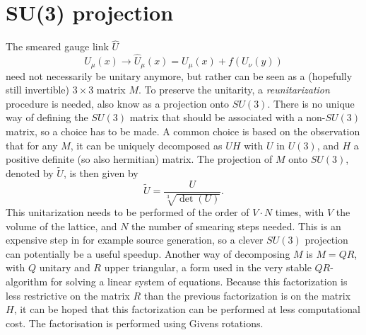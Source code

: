 \documentclass[a4paper,10pt]{article}
\begin{document}
\section{SU(3) projection}
The smeared gauge link $\hat{U}$
\begin{displaymath}
 U_{\mu}(x) \rightarrow\hat{U}_{\mu}(x)=U_{\mu}(x)+f(U_{\nu}(y))
\end{displaymath}
need not necessarily be unitary anymore, but rather can be seen as a (hopefully still invertible) $3\times 3$ matrix $M$. To preserve the unitarity, a \emph{reunitarization} procedure is needed, also know as a projection onto $SU(3)$. There is no unique way of defining the $SU(3)$ matrix that should be associated with a non-$SU(3)$ matrix, so a choice has to be made. A common choice is based on the observation that for any $M$, it can be uniquely decomposed as $UH$ with $U$ in $U(3)$, and $H$ a positive definite (so also hermitian) matrix. The projection of $M$ onto $SU(3)$, denoted by $\tilde{U}$, is then given by
\begin{displaymath}
 \tilde{U} = \frac{U}{\sqrt[3]{\det(U)}}.
\end{displaymath}
This unitarization needs to be performed of the order of $V\cdot N$ times, with $V$ the volume of the lattice, and $N$ the number of smearing steps needed. This is an expensive step in for example source generation, so a clever $SU(3)$ projection can potentially be a useful speedup.
Another way of decomposing $M$ is $M=QR$, with $Q$ unitary and $R$ upper triangular, a form used in the very stable $QR$-algorithm for solving a linear system of equations. Because this factorization is less restrictive on the matrix $R$ than the previous factorization is on the matrix $H$, it can be hoped that this factorization can be performed at less computational cost. The factorisation is performed using Givens rotations.
\end{document}
